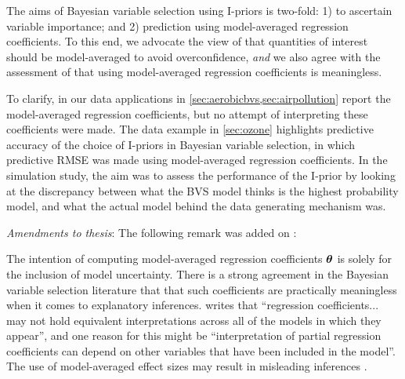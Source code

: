\documentclass[11pt,showframe,twoside,openright]{report}
\begin{document}
\begin{enumerate}
  The aims of Bayesian variable selection using I-priors is two-fold: 1) to ascertain variable importance; and 2) prediction using model-averaged regression coefficients.
  To this end, we advocate the view of \citet{madigan1994model,hoeting1999bayesian} that quantities of interest should be model-averaged to avoid overconfidence, \emph{and} we also agree with the assessment of \citet{banner2017considerations,cade2015model} that using model-averaged regression coefficients is meaningless.
  
  To clarify, in our data applications in \cref{sec:aerobicbvs,sec:airpollution} report the model-averaged regression coefficients, but no attempt of interpreting these coefficients were made.
  The data example in \cref{sec:ozone} highlights predictive accuracy of the choice of I-priors in Bayesian variable selection, in which predictive RMSE was made using model-averaged regression coefficients.
  In the simulation study, the aim was to assess the performance of the I-prior by looking at the discrepancy between what the BVS model thinks is the highest probability model, and what the actual model behind the data generating mechanism was.
  
  \textit{Amendments to thesis}: The following remark was added on :

\begin{displayquote}
  The intention of computing model-averaged regression coefficients ${\bm\theta}$ is solely for the inclusion of model uncertainty.  
  There is a strong agreement in the Bayesian variable selection literature that that such coefficients are practically meaningless when it comes to explanatory inferences.
  \citet{banner2017considerations} writes that ``regression coefficients... may not hold equivalent interpretations across all of the models in which they appear'', and one reason for this might be ``interpretation of partial regression coefficients can depend on other variables that have been included in the model''.
  The use of model-averaged effect sizes may result in misleading inferences \citep{cade2015model}.
\end{displayquote} 

\end{enumerate}



\end{document}
